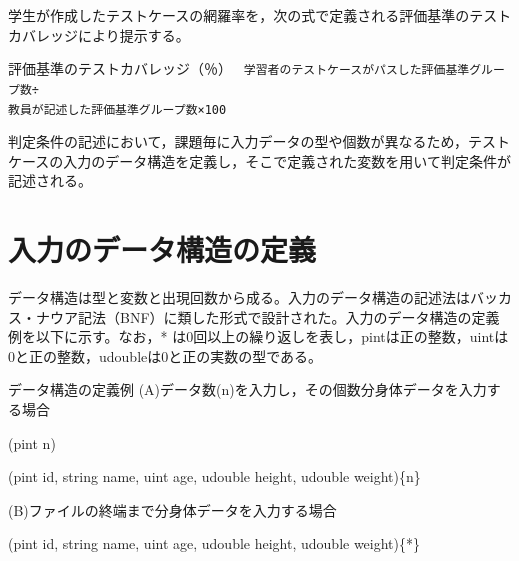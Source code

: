 \documentclass{tpu-sotu}
\begin{document}
学生が作成したテストケースの網羅率を，次の式で定義される評価基準のテストカバレッジにより提示する。\\
\begin{minipage}[b]{\textwidth}
\begin{itembox}[l]{評価基準のテストカバレッジ（％）}
{\tt
学習者のテストケースがパスした評価基準グループ数÷\\教員が記述した評価基準グループ数×100
}
\end{itembox}
\end{minipage}

判定条件の記述において，課題毎に入力データの型や個数が異なるため，テストケースの入力のデータ構造を定義し，そこで定義された変数を用いて判定条件が記述される。
\section{入力のデータ構造の定義}
データ構造は型と変数と出現回数から成る。入力のデータ構造の記述法はバッカス・ナウア記法（BNF）に類した形式で設計された。入力のデータ構造の定義例を以下に示す。なお，* は0回以上の繰り返しを表し，pintは正の整数，uintは0と正の整数，udoubleは0と正の実数の型である。\\
\begin{minipage}[b]{\textwidth}
\begin{itembox}[l]{データ構造の定義例}
(A)データ数(n)を入力し，その個数分身体データを入力する場合
{\tt

(pint n)

(pint id, string name, uint age, udouble height, udouble weight)\{n\}
}

(B)ファイルの終端まで分身体データを入力する場合
{\tt

(pint id, string name, uint age, udouble height, udouble weight)\{*\}
}

\end{itembox}
\end{minipage}
\end{document}
